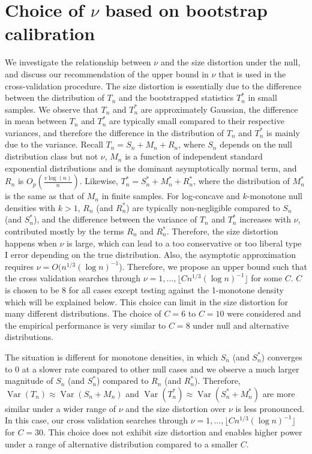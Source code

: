 \documentclass[12pt,letterpaper, twoside, openany]{article}
\DeclareMathOperator*{\Var}{Var}
\theoremstyle{plain}
\begin{document}
{
\section{Choice of $\nu$ based on bootstrap calibration}

We investigate the relationship between $\nu$ and the size distortion under the null, and discuss our recommendation of the upper bound in $\nu$ that is used in the cross-validation procedure.  The size distortion is essentially due to the difference between the distribution of $T_n$ and the bootstrapped statistics $T_n^*$ in small samples.  We observe that $T_n$ and $T_n^*$ are approximately Gaussian, the difference in mean between $T_n$ and $T_n^*$ are typically small compared to their respective variances, and therefore the difference in the distribution of $T_n$ and $T_n^*$ is mainly due to the variance.  Recall $T_n=S_n+M_n+R_n$, where $S_n$ depends on the null distribution class but not $\nu$, $M_n$ is a function of independent standard exponential distributions and is the dominant asymptotically normal term, and $R_n$ is $O_p(\frac{v\log(n)}{n})$.  Likewise, $T_n^*=S_n^*+M_n^*+R_n^*$, where the distribution of $M_n^*$ is the same as that of $M_n$ in finite samples.  For log-concave and $k$-monotone null densities with $k>1$, $R_n$ (and $R_n^*$) are typically non-negligible compared to $S_n$ (and $S_n^*$), and the difference between the variance of $T_n$ and $T_n^*$ increases with $\nu$, contributed mostly by the terms $R_n$ and $R_n^*$.  Therefore, the size distortion happens when $\nu$ is large, which can lead to a too conservative or too liberal type I error depending on the true distribution.  Also, the asymptotic approximation requires $\nu=O(n^{1/3}(\log n)^{-1}$).  Therefore, we propose an upper bound such that the cross validation searches through $\nu=1,\ldots, \lfloor C n^{1/3} (\log n)^{-1} \rfloor$ for some $C$.  $C$ is chosen to be $8$ for all cases except testing against the 1-monotone density which will be explained below.  This choice can limit in the size distortion for many different distributions.  The choice of $C=6$ to $C=10$ were considered and the empirical performance is very similar to $C=8$ under null and alternative distributions.  

The situation is different for monotone densities, in which $S_n$ (and $S_n^*$) converges to $0$ at a slower rate compared to other null cases and we observe a much larger magnitude of $S_n$ (and $S_n^*$) compared to $R_n$ (and $R_n^*$).  Therefore, $\Var(T_n)\approx \Var(S_n+M_n)$ and $\Var(T_n^*)\approx \Var(S_n^*+M_n^*)$ are more similar under a wider range of $\nu$ and the size distortion over $\nu$ is less pronounced.  In this case, our cross validation searches through $\nu=1,\ldots, \lfloor C n^{1/3} (\log n)^{-1} \rfloor$ for $C=30$.  This choice does not exhibit size distortion and enables higher power under a range of alternative distribution compared to a smaller $C$.

}
\end{document}
